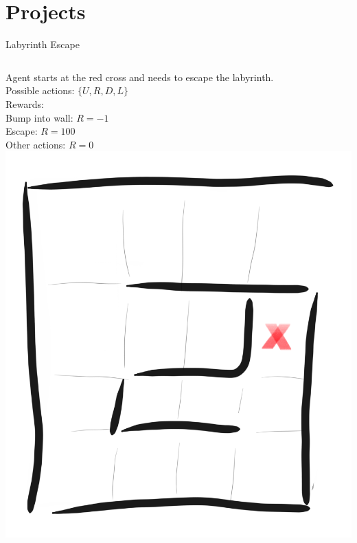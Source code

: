 \documentclass{beamer}
\begin{document}

\section{Projects}

\begin{frame}{Labyrinth Escape}
	\begin{columns}
	Agent starts at the red cross and needs to escape the labyrinth.\\
	\vspace{0.5cm}
	Possible actions: $\{ U, R, D, L \}$ \\
	\vspace{0.5cm}
	Rewards: \\
	\hspace{1cm} Bump into wall: $R = -1$ \\
	\hspace{1cm} Escape: $R = 100$ \\
	\hspace{1cm} Other actions: $R = 0$ \\
	\includegraphics[width=\linewidth]{Images/sketch.png}\\	
	\end{columns}	
\end{frame}
\end{document}
